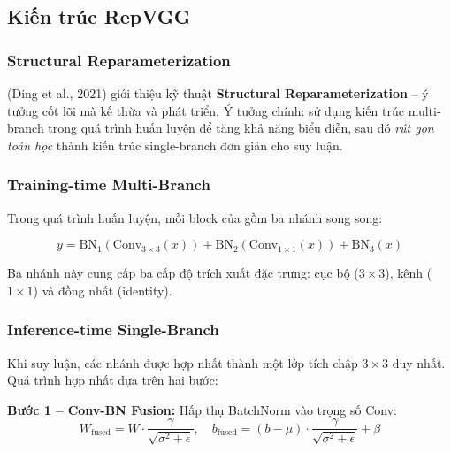\subsection{Kiến trúc RepVGG}
\label{subsec:repvgg}

\subsubsection*{Structural Reparameterization}

\repvgg{} \cite{repvgg2021} (Ding et al., 2021) giới thiệu kỹ thuật \textbf{Structural Reparameterization} -- ý tưởng cốt lõi mà \fastvit{} kế thừa và phát triển. Ý tưởng chính: sử dụng kiến trúc multi-branch trong quá trình huấn luyện để tăng khả năng biểu diễn, sau đó \textit{rút gọn toán học} thành kiến trúc single-branch đơn giản cho suy luận.

\subsubsection*{Training-time Multi-Branch}

Trong quá trình huấn luyện, mỗi block của \repvgg{} gồm ba nhánh song song:

\begin{equation}
    y = \text{BN}_1(\text{Conv}_{3\times3}(x)) + \text{BN}_2(\text{Conv}_{1\times1}(x)) + \text{BN}_3(x)
    \label{eq:repvgg_train}
\end{equation}

Ba nhánh này cung cấp ba cấp độ trích xuất đặc trưng: cục bộ ($3 \times 3$), kênh ($1 \times 1$) và đồng nhất (identity).

\subsubsection*{Inference-time Single-Branch}

Khi suy luận, các nhánh được hợp nhất thành một lớp tích chập $3 \times 3$ duy nhất. Quá trình hợp nhất dựa trên hai bước:

\textbf{Bước 1 -- Conv-BN Fusion:} Hấp thụ BatchNorm vào trọng số Conv:
\begin{equation}
    W_{\text{fused}} = W \cdot \frac{\gamma}{\sqrt{\sigma^2 + \epsilon}}, \quad b_{\text{fused}} = (b - \mu) \cdot \frac{\gamma}{\sqrt{\sigma^2 + \epsilon}} + \beta
    \label{eq:conv_bn_fusion}
\end{equation}

